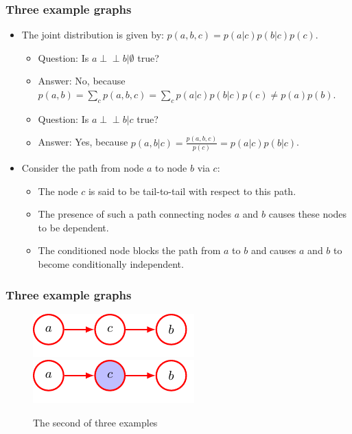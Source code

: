 \documentclass{beamer}
\newcommand{\ind}{\perp\!\!\!\!\perp}
\begin{document}
\begin{frame}
    \frametitle{Three example graphs}
    \begin{itemize}
        \item The joint distribution is given by: $p(a,b,c)=p(a|c)p(b|c)p(c)$.
        \begin{itemize}
            \item Question: Is $a\ind{}b|\emptyset$ true?
            \item Answer: No, because $p(a,b)=\sum_{c}p(a,b,c)=\sum_{c}p(a|c)p(b|c)p(c)\ne{}p(a)p(b)$.
            \item Question: Is $a\ind{}b|c$ true?
            \item Answer: Yes, because $p(a,b|c)=\frac{p(a,b,c)}{p(c)}=p(a|c)p(b|c)$.
        \end{itemize}
        \item Consider the path from node $a$ to node $b$ via $c$:
        \begin{itemize}
            \item The node $c$ is said to be tail-to-tail with respect to this path.
            \item The presence of such a path connecting nodes $a$ and $b$ causes these nodes to be dependent.
            \item The conditioned node blocks the path from $a$ to $b$ and causes $a$ and $b$ to become conditionally independent.
        \end{itemize}
    \end{itemize}
\end{frame}

\begin{frame}
    \frametitle{Three example graphs}
    \begin{figure}
        \caption{The second of three examples}
        \includegraphics[trim=0 0 -1cm 0]{Figure_16.pdf}
        \includegraphics[trim=-1cm 0 0 0]{Figure_17.pdf}
    \end{figure}
\end{frame}
\end{document}
